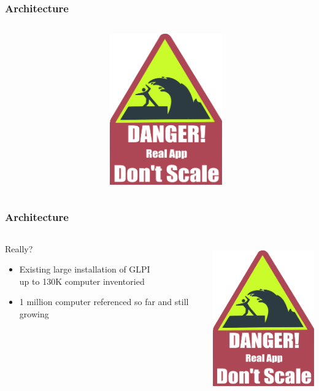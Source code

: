 \documentclass{beamer}
\begin{document}
\begin{frame}
    \frametitle{Architecture}

 \begin{columns}
 \begin{column}{0.34\textwidth}
 \end{column}
 \begin{column}{0.90\textwidth}
    \includegraphics[height=6.5cm]{pics/scale.pdf}
 \end{column}
\end{columns}

\end{frame}

\begin{frame}
    \frametitle{Architecture}

 \begin{columns}
 \begin{column}{0.34\textwidth}
    \begin{block}{Really?}
        \begin{itemize}
            \item Existing large installation of GLPI \\
            {\small up to 130K computer inventoried}
            \item 1 million computer referenced so far and still growing
        \end{itemize}
    \end{block}

 \end{column}
 \begin{column}{0.90\textwidth}
    \includegraphics[height=6.5cm]{pics/scale.pdf}

 \end{column}
\end{columns}

\end{frame}
\end{document}
